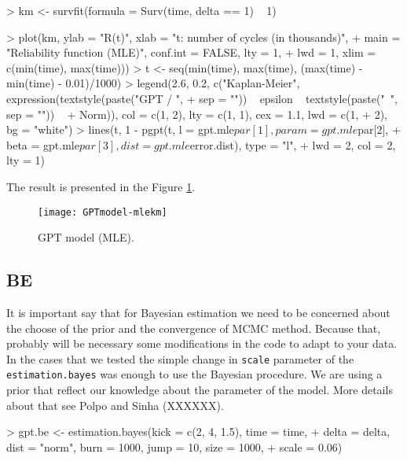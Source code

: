 \documentclass[nogin,letterpaper,12pt]{article}
\begin{document}
\begin{Schunk}
\begin{Sinput}
> km <- survfit(formula = Surv(time, delta == 1) ~ 1)
\end{Sinput}
\end{Schunk}
\begin{Schunk}
\begin{Sinput}
> plot(km, ylab = "R(t)", xlab = "t: number of cycles (in thousands)", 
+     main = "Reliability function (MLE)", conf.int = FALSE, lty = 1, 
+     lwd = 1, xlim = c(min(time), max(time)))
> t <- seq(min(time), max(time), (max(time) - min(time) - 0.01)/1000)
> legend(2.6, 0.2, c("Kaplan-Meier", expression(textstyle(paste("GPT / ", 
+     sep = "")) ~ epsilon ~ textstyle(paste("~", sep = "")) ~ 
+     Norm)), col = c(1, 2), lty = c(1, 1), cex = 1.1, lwd = c(1, 
+     2), bg = "white")
> lines(t, 1 - pgpt(t, l = gpt.mle$par[1], param = gpt.mle$par[2], 
+     beta = gpt.mle$par[3], dist = gpt.mle$error.dist), type = "l", 
+     lwd = 2, col = 2, lty = 1)
\end{Sinput}
\end{Schunk}

The result is presented in the Figure \ref{figgptmle}.

\begin{figure}[ht!]
\centering
\captionsetup{justification=centering}
\texttt{[image: GPTmodel-mlekm]}
\caption{GPT model (MLE).}
\label{figgptmle}
\end{figure}


\subsection{BE}

It is important say that for Bayesian estimation we need to be concerned about the choose of the prior and the convergence of MCMC method. Because that, probably will be necessary some modifications in the code to adapt to your data. In the cases that we tested the simple change in \verb=scale= parameter of the \verb=estimation.bayes= was enough to use the Bayesian procedure. We are using a prior that reflect our knowledge about the parameter of the model. More details about that see Polpo and Sinha (XXXXXX). 

\begin{Schunk}
\begin{Sinput}
> gpt.be <- estimation.bayes(kick = c(2, 4, 1.5), time = time, 
+     delta = delta, dist = "norm", burn = 1000, jump = 10, size = 1000, 
+     scale = 0.06)
\end{Sinput}
\end{Schunk}
\end{document}

